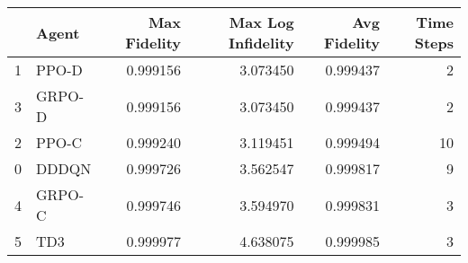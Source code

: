 \begin{tabular}{llrrrr}
\toprule
 & Agent & Max Fidelity & Max Log Infidelity & Avg Fidelity & Time Steps \\
\midrule
1 & PPO-D & 0.999156 & 3.073450 & 0.999437 & 2 \\
3 & GRPO-D & 0.999156 & 3.073450 & 0.999437 & 2 \\
2 & PPO-C & 0.999240 & 3.119451 & 0.999494 & 10 \\
0 & DDDQN & 0.999726 & 3.562547 & 0.999817 & 9 \\
4 & GRPO-C & 0.999746 & 3.594970 & 0.999831 & 3 \\
5 & TD3 & 0.999977 & 4.638075 & 0.999985 & 3 \\
\bottomrule
\end{tabular}
